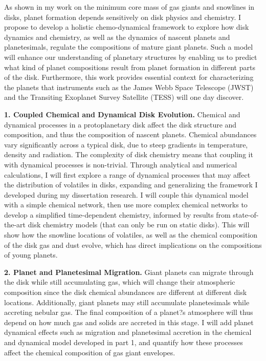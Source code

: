 \documentclass[12pt, letterpaper]{article}
\begin{document}
As shown in my work on the minimum core mass of gas giants and snowlines in disks, planet formation depends sensitively on disk physics and chemistry. I propose to develop a holistic chemo-dynamical framework to explore how disk dynamics and chemistry, as well as the dynamics of nascent planets and planetesimals, regulate the compositions of mature giant planets. Such a model will enhance our understanding of planetary structures by enabling us to predict what kind of planet compositions result from planet formation in different parts of the disk. Furthermore, this work provides essential context for characterizing the planets that instruments such as the James Webb Space Telescope (JWST) and the Transiting Exoplanet Survey Satellite (TESS) will one day discover. 

\textbf{1. Coupled Chemical and Dynamical Disk Evolution.} Chemical and dynamical processes in a protoplanetary disk affect the disk structure and composition, and thus the composition of nascent planets. Chemical abundances vary significantly across a typical disk, due to steep gradients in temperature, density and radiation. The complexity of disk chemistry means that coupling it with dynamical processes is non-trivial. Through analytical and numerical calculations, I will first explore a range of dynamical processes that may affect the distribution of volatiles in disks, expanding and generalizing the framework I developed during my dissertation research. I will couple this dynamical model with a simple chemical network, then use more complex chemical networks to develop a simplified time-dependent chemistry, informed by results from state-of-the-art disk chemistry models (that can only be run on static disks). This will show how the snowline locations of volatiles, as well as the chemical composition of the disk gas and dust evolve, which has direct implications on the compositions of young planets.

\textbf{2. Planet and Planetesimal Migration.} Giant planets can migrate through the disk while still accumulating gas, which will change their atmospheric composition since the disk chemical abundances are different at different disk locations. Additionally, giant planets may still accumulate planetesimals while accreting nebular gas. The final composition of a planet?s atmosphere will thus depend on how much gas and solids are accreted in this stage. I will add planet dynamical effects such as migration and planetesimal accretion in the chemical and dynamical model developed in part 1, and quantify how these processes affect the chemical composition of gas giant envelopes. 
\end{document}
